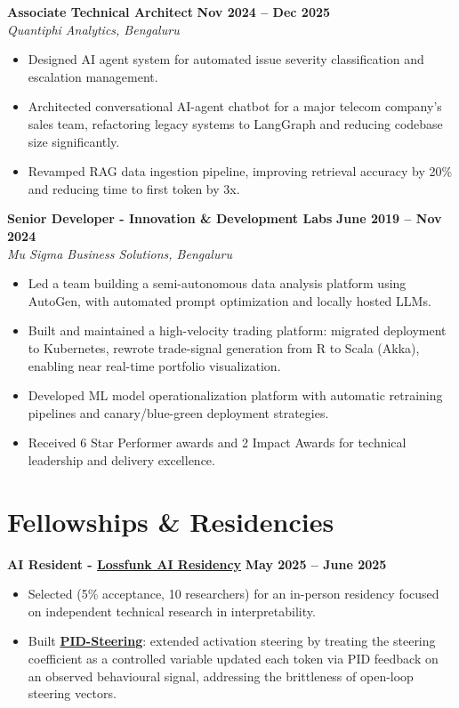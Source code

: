\documentclass[11pt,a4paper]{article}
\newcommand{\entrygap}{\vspace{8pt}}
\begin{document}
\entrygap
\textbf{Associate Technical Architect} \hfill \textbf{Nov 2024 -- Dec 2025} \\
\textit{Quantiphi Analytics, Bengaluru}
\begin{itemize}[leftmargin=*, nosep]
\item Designed AI agent system for automated issue severity classification and escalation management.
\item Architected conversational AI-agent chatbot for a major telecom company's sales team, refactoring legacy systems to LangGraph and reducing codebase size significantly.
\item Revamped RAG data ingestion pipeline, improving retrieval accuracy by 20\% and reducing time to first token by 3x.
\end{itemize}

\entrygap
\textbf{Senior Developer - Innovation \& Development Labs} \hfill \textbf{June 2019 -- Nov 2024} \\
\textit{Mu Sigma Business Solutions, Bengaluru}
\begin{itemize}[leftmargin=*, nosep]
\item Led a team building a semi-autonomous data analysis platform using AutoGen, with automated prompt optimization and  locally hosted LLMs.
\item Built and maintained a high-velocity trading platform: migrated deployment to Kubernetes, rewrote trade-signal generation from R to Scala (Akka), enabling near real-time portfolio visualization.
\item Developed ML model operationalization platform with automatic retraining pipelines and canary/blue-green deployment strategies.
\item Received 6 Star Performer awards and 2 Impact Awards for technical leadership and delivery excellence.
\end{itemize}

\section{Fellowships \& Residencies}

\textbf{AI Resident - \href{https://lossfunk.com/residency/}{Lossfunk AI Residency}} \hfill \textbf{May 2025 -- June 2025}
\begin{itemize}[leftmargin=*, nosep]
\item Selected (5\% acceptance, 10 researchers) for an in-person residency focused on independent technical research in interpretability.
\item Built \href{https://github.com/arbdwj/pid_steering}{\textbf{PID-Steering}}: extended activation steering by treating the steering coefficient as a controlled variable updated each token via PID feedback on an observed behavioural signal, addressing the brittleness of open-loop steering vectors.
\end{itemize}
\newpage
\end{document}
